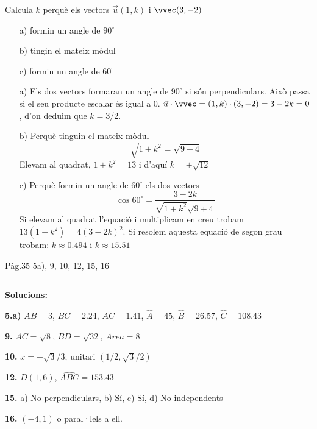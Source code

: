 \documentclass[11pt, a4paper, pdf]{article}
\renewcommand{\hot}[1][]{
	\ifthenelse{\equal{#1}{}}{$\mathbf{\bigstar}$ LLIBRE $\mathbf{\bigstar}$: }{\myrepeat{#1}{$\mathbf{\bigstar}$}}
}
\begin{document}
 \begin{resolt}[E]{Calcula $k$ perquè els vectors $\vec u(1, k)$ i $\vvec(3,-2)$ \vspace{1em}
 		
 		\begin{enumerate}\setlength\itemsep{1em}
 			\item[a)] formin un angle de $90^\circ$
 			
 			
 			
 			\item[b)] tingin el mateix mòdul
 			
 			
 			\item[c)] formin un angle de $60^\circ$
 		\end{enumerate}	
 	}
 	\begin{enumerate} 
 		\item[a)] Els dos vectors formaran un angle de $90^\circ$ si són perpendiculars. Això passa si el seu producte escalar és igual a 0. $\vec u \cdot \vvec = (1, k) \cdot (3,-2) = 3-2k=0$, d'on deduim que $k=3/2$. 
 		
 		\item[b)] Perquè tinguin el mateix mòdul
 		\begin{equation*}
 		\sqrt{1+k^2} = \sqrt{9+4}
 		\end{equation*}
 		Elevam al quadrat, $1+k^2=13$ i d'aquí $k=\pm \sqrt{12}$
 		
 		
 		\item[c)] Perquè formin un angle de $60^\circ$ els dos vectors
 		\begin{equation*}
 		\cos 60^\circ = \frac{3-2k}{\sqrt{1+k^2}\sqrt{9+4}}
 		\end{equation*}
 		Si elevam al quadrat l'equació i multiplicam en creu trobam $13(1+k^2)=4(3-2k)^2$. Si resolem aquesta equació de segon grau trobam: $k\approx 0.494$ i $k\approx 15.51$
 	\end{enumerate}
 \end{resolt}
  \vspace{0.5cm}
  
 \hot Pàg.35 5a), 9, 10, 12, 15, 16
   \vspace{0.5cm}
   
 \hrule
 \textbf{Solucions:}
 \begin{multicols}{2}
\textbf{5.a)} $AB=3$, $BC=2.24$, $AC=1.41$, $\hat A=45$, $\hat B=26.57$, $\hat C=108.43$
 
\textbf{9.} $AC=\sqrt{8}$, $BD=\sqrt{32}$, $Area=8$
 
 \textbf{10.} $x=\pm \sqrt{3}/3$; unitari $(1/2, \sqrt{3}/2)$
 
\textbf{ 12.} $D(1,6)$,  $\widehat{ABC}=153.43$
 
 \textbf{15.} a) No perpendiculars, b) Sí, c) Sí, d) No independents
 
\textbf{ 16.} $(-4, 1)$ o paral·lels a ell.
 \end{multicols}
  
\end{document}
